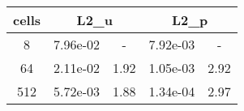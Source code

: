 \documentclass[10pt]{report}
\begin{document}
\begin{table}[H]
\begin{center}
\begin{tabular}{|c|c|c|c|c|} \hline
cells & 
\multicolumn{2}{|c|}{L2_u} & 
\multicolumn{2}{|c|}{L2_p}\\ \hline
8 & 7.96e-02 & - & 7.92e-03 & -\\ \hline
64 & 2.11e-02 & 1.92 & 1.05e-03 & 2.92\\ \hline
512 & 5.72e-03 & 1.88 & 1.34e-04 & 2.97\\ \hline
\end{tabular}
\end{center}
\end{table}
\end{document}
